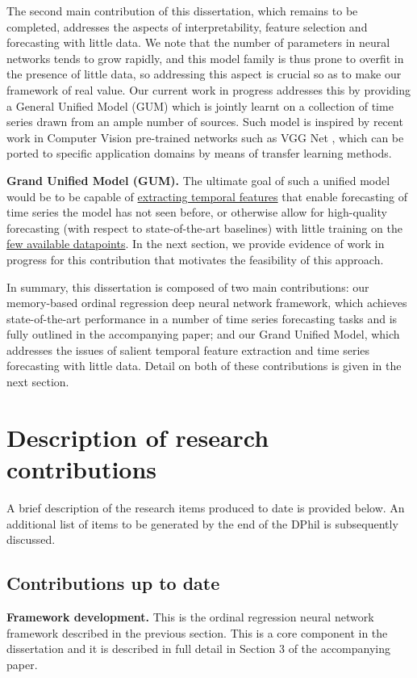 \documentclass[pdftex,12pt,a4paper]{article}
\theoremstyle{definition}
\theoremstyle{remark}
\begin{document}
The second main contribution of this dissertation, which remains to be completed, addresses the aspects of interpretability, feature selection and forecasting with little data. We note that the number of parameters in neural networks tends to grow rapidly, and this model family is thus prone to overfit in the presence of little data, so addressing this aspect is crucial so as to make our framework of real value. Our current work in progress addresses this by providing a General Unified Model (GUM) which is jointly learnt on a collection of time series drawn from an ample number of sources. Such model is inspired by recent work in Computer Vision pre-trained networks such as VGG Net \cite{Simonyan2015}, which can be ported to specific application domains by means of transfer learning methods. 

\textbf{Grand Unified Model (GUM).} The ultimate goal of such a unified model would be to be capable of \underline{extracting temporal features} that enable forecasting of time series the model has not seen before, or otherwise allow for high-quality forecasting (with respect to state-of-the-art baselines) with little training on the \underline{few available datapoints}. In the next section, we provide evidence of work in progress for this contribution that motivates the feasibility of this approach. 

In summary, this dissertation is composed of two main contributions: our memory-based ordinal regression deep neural network framework, which achieves state-of-the-art performance in a number of time series forecasting tasks and is fully outlined in the accompanying paper; and our Grand Unified Model, which addresses the issues of salient temporal feature extraction and time series forecasting with little data. Detail on both of these contributions is given in the next section. 

\section{Description of research contributions}
A brief description of the research items produced to date is provided below. An additional list of items to be generated by the end of the DPhil is subsequently discussed.

\subsection{Contributions up to date}

\textbf{Framework development.} This is the ordinal regression neural network framework described in the previous section. This is a core component in the dissertation and it is described in full detail in Section 3 of the accompanying paper.
\end{document}
